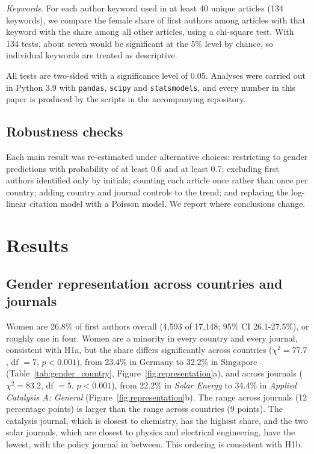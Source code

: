 \documentclass[preprint,12pt,number]{elsarticle}
\begin{document}
\textit{Keywords.} For each author keyword used in at least 40 unique articles (134 keywords), we compare the female share of first authors among articles with that keyword with the share among all other articles, using a chi-square test. With 134 tests, about seven would be significant at the 5\% level by chance, so individual keywords are treated as descriptive.

All tests are two-sided with a significance level of 0.05. Analyses were carried out in Python 3.9 with \texttt{pandas}, \texttt{scipy} and \texttt{statsmodels}, and every number in this paper is produced by the scripts in the accompanying repository.

\subsection{Robustness checks}

Each main result was re-estimated under alternative choices: restricting to gender predictions with probability of at least 0.6 and at least 0.7; excluding first authors identified only by initials; counting each article once rather than once per country; adding country and journal controls to the trend; and replacing the log-linear citation model with a Poisson model. We report where conclusions change.

\section{Results}

\subsection{Gender representation across countries and journals}

Women are 26.8\% of first authors overall (4,593 of 17,148; 95\% CI 26.1-27.5\%), or roughly one in four. Women are a minority in every country and every journal, consistent with H1a, but the share differs significantly across countries ($\chi^2 = 77.7$, df $=7$, $p<0.001$), from 23.4\% in Germany to 32.2\% in Singapore (Table~\ref{tab:gender_country}, Figure~\ref{fig:representation}a), and across journals ($\chi^2 = 83.2$, df $=5$, $p<0.001$), from 22.2\% in \textit{Solar Energy} to 34.4\% in \textit{Applied Catalysis A: General} (Figure~\ref{fig:representation}b). The range across journals (12 percentage points) is larger than the range across countries (9 points). The catalysis journal, which is closest to chemistry, has the highest share, and the two solar journals, which are closest to physics and electrical engineering, have the lowest, with the policy journal in between. This ordering is consistent with H1b.
\end{document}

